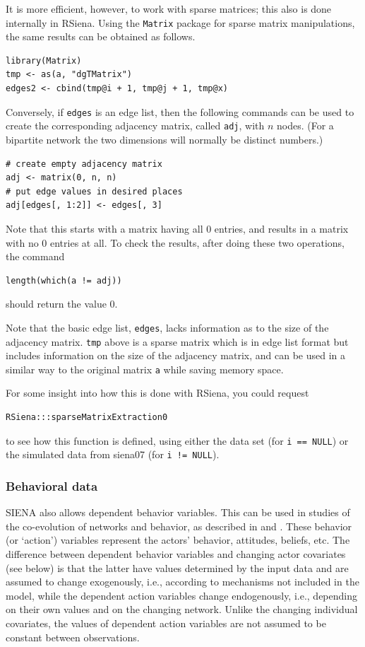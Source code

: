 \documentclass[a4paper,fleqn,11pt]{article}
\newcommand{\+}{\, + \,}
\newcommand{\sfn}[1]{\textsf{#1}}
\newcommand{\rs}{{\sf RSiena}}
\newcommand{\SI}{{\sf SIENA }}
\begin{document}
It is more efficient, however, to work with sparse matrices;
this also is done internally in \rs.
Using the \texttt{Matrix} package for sparse matrix manipulations,
the same results can be obtained as follows.
\begin{verbatim}
library(Matrix)
tmp <- as(a, "dgTMatrix")
edges2 <- cbind(tmp@i + 1, tmp@j + 1, tmp@x)
\end{verbatim}
Conversely, if \texttt{edges} is an edge list, then the following commands
can be used to create the corresponding
adjacency matrix, called \texttt{adj},
with $n$ nodes. (For a bipartite network the two dimensions
will normally be distinct numbers.)
\begin{verbatim}
# create empty adjacency matrix
adj <- matrix(0, n, n)
# put edge values in desired places
adj[edges[, 1:2]] <- edges[, 3]
\end{verbatim}
Note that this starts with a matrix having all 0 entries,
and results in a matrix with no 0 entries at all.
To check the results, after doing these two operations, the command
\begin{verbatim}
length(which(a != adj))
\end{verbatim}
should return the value 0.

Note that the basic edge list, \verb|edges|, lacks information as to the size of
the adjacency matrix. \verb|tmp| above is a sparse matrix which is in edge list
format but includes information on the size of the adjacency matrix, and can be
used in a similar way to the original matrix \verb|a| while saving memory space.

For some insight into how this is done with \rs, you could request
\begin{verbatim}
RSiena:::sparseMatrixExtraction0
\end{verbatim}
to see how this function is defined, using either the data set (for \texttt{i == NULL})
or the simulated data from \sfn{siena07} (for \texttt{i != NULL}).


\subsubsection{Behavioral data}

\SI also allows dependent behavior variables. This can be used in studies
of the co-evolution of networks and behavior, as described
in \citet*{SnijdersEA07} and \citet*{SteglichEA10}.
These behavior (or `action') variables represent
the actors' behavior, attitudes, beliefs, etc.
The difference between dependent behavior variables and changing actor
covariates (see below) is that the latter
have values determined by the input data and are assumed to
change exogenously, i.e., according
to mechanisms not included in the model, while the dependent
action variables change endogenously, i.e.,
depending on their own values and on the changing network.
Unlike the changing individual covariates,
the values of dependent action variables are not assumed to be
constant between observations.
\end{document}
